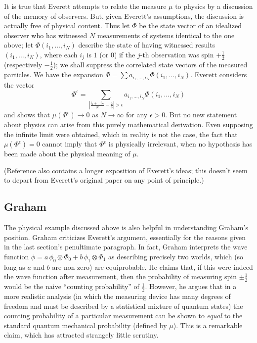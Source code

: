 \documentclass[aps,pra,12pt]{revtex4}
\begin{document}
It is true that Everett attempts to relate the measure $\mu$ to physics by a
discussion of the memory of observers. 
But, given Everett's assumptions, the discussion
is actually free of physical content. 
Thus let $\Phi$ be the state vector of an idealized observer who has witnessed
$N$ measurements of systems identical to the one above; 
let $\Phi (i_1 , \ldots , i_N )$ describe the state of having witnessed
results $(i_1 , \ldots , i_N )$, where each $i_j$ is $1$ (or $0$) if the 
$j$-th observation was spin $+\frac{1}{2}$ (respectively 
$-\frac{1}{2}$); we shall 
suppress the correlated state vectors of the measured particles. 
We have the expansion 
$\Phi = \sum  a_{i_1 , \ldots , i_N}\Phi (i_1 , \ldots , i_N )$.
Everett considers the vector
\begin{equation}
\Phi^{\epsilon} = 
\sum_{| \frac{i_1 + \ldots i_N}{N} - \frac{2}{3} | > \epsilon}
 a_{i_1 , \ldots , i_N}\Phi (i_1 , \ldots , i_N )
\end{equation}
and shows that $\mu(\Phi^{\epsilon}) \rightarrow 0$ as $N \rightarrow \infty$
for any $\epsilon > 0$. 
But no new statement about physics can arise from this purely mathematical
derivation.  
Even supposing the infinite limit were obtained, which in reality is not
the case, the fact that
$\mu (\Phi^{\epsilon})=0 $ cannot imply that $\Phi^{\epsilon}$ is
physically irrelevant, when no hypothesis has been made about the
physical meaning of $\mu$.

(Reference \cite{mwbook} also contains a
longer exposition\cite{ev2} of Everett's ideas; this doesn't seem to depart 
from Everett's original paper on any point of principle.) 

\subsection{Graham}

The physical example discussed above is also helpful in understanding 
Graham's position.  
Graham criticizes Everett's argument, essentially for the reasons given in
the last section's penultimate paragraph. 
In fact, Graham interprets the wave function 
$\phi = a \, \phi_0 \otimes \Phi_0 + b \, \phi_1 \otimes \Phi_1$
as describing precisely two worlds, which (so long as $a$ and $b$ are non-zero)
are equiprobable. 
He claims that, if this were indeed the wave function after measurement,
then the probability of measuring 
spin $\pm \frac{1}{2}$ would be the naive ``counting probability'' of 
$\frac{1}{2}$.
However, he argues that in a more realistic analysis (in which the measuring 
device has many degrees of freedom and must be described by a statistical
mixture of quantum states) the counting probability of a particular
measurement can be shown to {\em equal} to the standard quantum mechanical
probability (defined by $\mu$). 
This is a remarkable claim, which has attracted strangely little scrutiny. 
\end{document}
